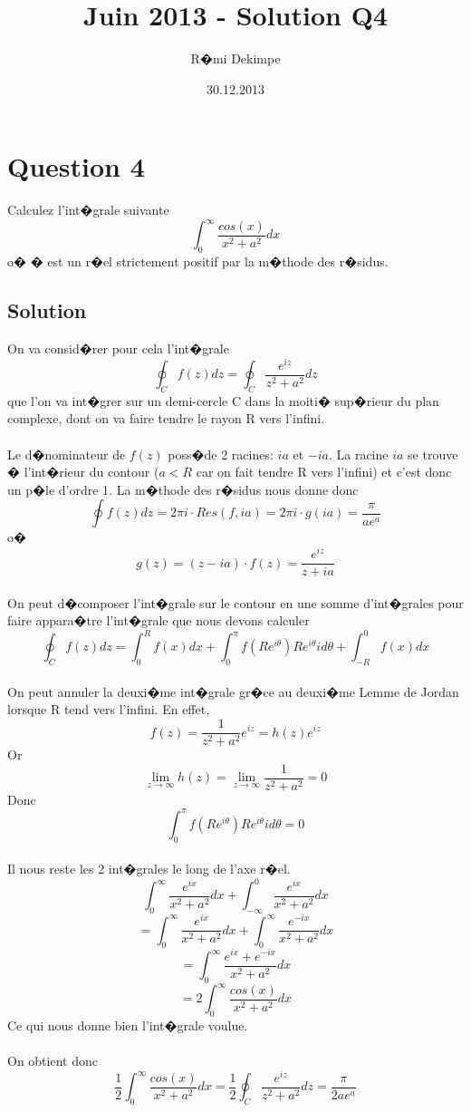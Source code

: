 \documentclass{article}
\title{Juin 2013 - Solution Q4}
\author{R�mi Dekimpe}
\date{30.12.2013}
\begin{document}
\maketitle

\section*{Question 4}
Calculez l'int�grale suivante
\[
\int_{0}^{\infty} \frac{cos(x)}{x^2+a^2} dx
\]
o� � est un r�el strictement positif par la m�thode des r�sidus.

\subsection*{Solution}
On va consid�rer pour cela l'int�grale
\[
\oint_C f(z) dz =\oint_C \frac{e^{iz}}{z^2+a^2} dz
\]
que l'on va int�grer sur un demi-cercle C dans la moiti� sup�rieur du plan complexe, dont on va faire tendre le rayon R vers l'infini.
\paragraph{} Le d�nominateur de $f(z)$ poss�de 2 racines: $ia$ et $-ia$. La racine $ia$ se trouve � l'int�rieur du contour ($a<R$ car on fait tendre R vers l'infini) et c'est donc un p�le d'ordre 1. La m�thode des r�sidus nous donne donc
\[
\oint f(z) dz=2\pi i \cdot Res(f,ia)=2\pi i\cdot g(ia) = \frac{\pi}{ae^{a}}
\]
o�
\[
g(z)=(z-ia)\cdot f(z)=\frac{e^{iz}}{z+ia}
\]

\paragraph{} On peut d�composer l'int�grale sur le contour en une somme d'int�grales pour faire appara�tre l'int�grale que nous devons calculer
\[
\oint_C f(z) dz=\int_0^{R} f(x)dx + \int_0^{\pi} f(Re^{i\theta})Re^{i\theta}id\theta+ \int_{-R}^0 f(x)dx
\]
\paragraph{} On peut annuler la deuxi�me int�grale gr�ce au deuxi�me Lemme de Jordan lorsque R tend vers l'infini. En effet,
\[
f(z)=\frac{1}{z^2+a^2} e^{iz}=h(z)e^{iz}
\]
Or
\[
\lim\limits_{z \to \infty} h(z)=\lim\limits_{z \to \infty} \frac{1}{z^2+a^2}=0
\]
Donc
\[
\int_0^{\pi} f(Re^{i\theta})Re^{i\theta}id\theta=0
\]
\paragraph{} Il nous reste les 2 int�grales le long de l'axe r�el.
\[
\int_0^{\infty} \frac{e^{ix}}{x^2+a^2} dx + \int_{-\infty}^0 \frac{e^{ix}}{x^2+a^2}dx
\]
\[
=\int_0^{\infty} \frac{e^{ix}}{x^2+a^2} dx+ \int_0^{\infty}\frac{e^{-ix}}{x^2+a^2} dx
\]
\[
=\int_0^{\infty} \frac{e^{ix}+e^{-ix}}{x^2+a^2} dx
\]
\[
=2\int_0^{\infty} \frac{cos(x)}{x^2+a^2} dx
\]
Ce qui nous donne bien l'int�grale voulue.
\paragraph{} On obtient donc
\[
\frac{1}{2}\int_0^{\infty} \frac{cos(x)}{x^2+a^2} dx=\frac{1}{2}\oint_C \frac{e^{iz}}{z^2+a^2} dz=\frac{\pi}{2ae^{a}}
\]
\end{document}
